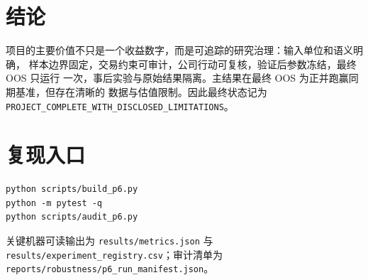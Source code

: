 \documentclass[11pt,a4paper]{ctexart}
\begin{document}
\section{结论}
项目的主要价值不只是一个收益数字，而是可追踪的研究治理：输入单位和语义明确，
样本边界固定，交易约束可审计，公司行动可复核，验证后参数冻结，最终 OOS 只运行
一次，事后实验与原始结果隔离。主结果在最终 OOS 为正并跑赢同期基准，但存在清晰的
数据与估值限制。因此最终状态记为
\texttt{PROJECT\_COMPLETE\_WITH\_DISCLOSED\_LIMITATIONS}。

\appendix
\section{复现入口}
\begin{verbatim}
python scripts/build_p6.py
python -m pytest -q
python scripts/audit_p6.py
\end{verbatim}
关键机器可读输出为 \texttt{results/metrics.json} 与
\texttt{results/experiment\_registry.csv}；审计清单为
\texttt{reports/robustness/p6\_run\_manifest.json}。
\end{document}
